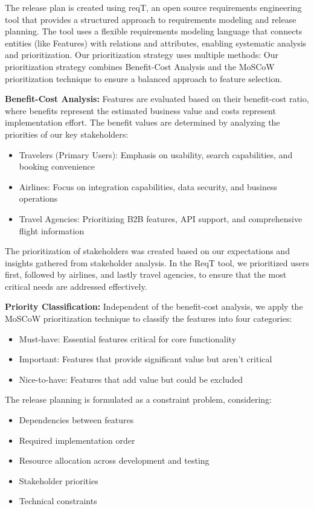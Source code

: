 The release plan is created using reqT, an open source requirements engineering tool that provides a structured approach to requirements modeling and release planning. The tool uses a flexible requirements modeling language that connects entities (like Features) with relations and attributes, enabling systematic analysis and prioritization. Our prioritization strategy uses multiple methods:
Our prioritization strategy combines Benefit-Cost Analysis and the MoSCoW prioritization technique to ensure a balanced approach to feature selection.

\textbf{Benefit-Cost Analysis:} Features are evaluated based on their benefit-cost ratio, where benefits represent the estimated business value and costs represent implementation effort. The benefit values are determined by analyzing the priorities of our key stakeholders:
\begin{itemize}
\item Travelers (Primary Users): Emphasis on usability, search capabilities, and booking convenience
\item Airlines: Focus on integration capabilities, data security, and business operations
\item Travel Agencies: Prioritizing B2B features, API support, and comprehensive flight information
\end{itemize}

The prioritization of stakeholders was created based on our expectations and insights gathered from stakeholder analysis. In the ReqT tool, we prioritized users first, followed by airlines, and lastly travel agencies, to ensure that the most critical needs are addressed effectively.

\textbf{Priority Classification:} Independent of the benefit-cost analysis, we apply the MoSCoW prioritization technique to classify the features into four categories:
\begin{itemize}
\item Must-have: Essential features critical for core functionality
\item Important: Features that provide significant value but aren't critical
\item Nice-to-have: Features that add value but could be excluded
\end{itemize}

The release planning is formulated as a constraint problem, considering:
\begin{itemize}
\item Dependencies between features
\item Required implementation order
\item Resource allocation across development and testing
\item Stakeholder priorities
\item Technical constraints
\end{itemize}

